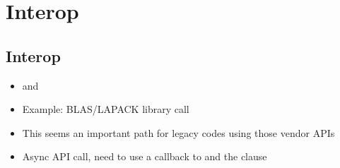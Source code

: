 
\def\ArtDir{08.Interop/figures}

\chapter{Interop}
\label{chapter:interop}

\section{Interop}
\label{sec:interop}
\begin{itemize}
  \item {} and 
  \item Example: BLAS/LAPACK library call
  \item This seems an important path for legacy codes using those vendor APIs
  \item Async API call, need to use a callback to  and the  clause
\end{itemize}
